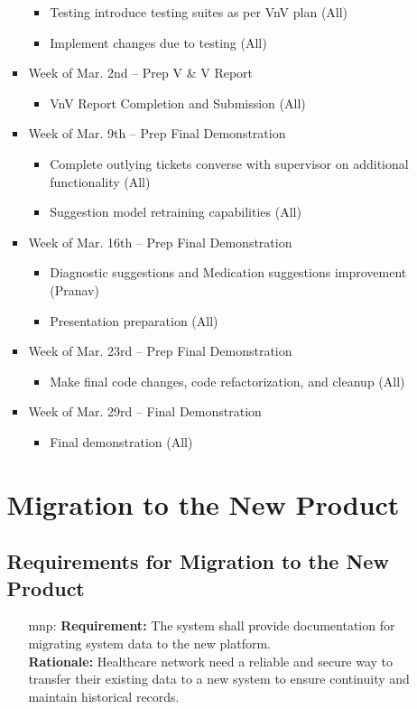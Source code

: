 \documentclass[12pt]{article}
\newcounter{mnpnum} %
\begin{document}
\begin{itemize}
\begin{itemize}
\begin{itemize}
\begin{itemize}
      \item Testing introduce testing suites as per VnV plan (All)
      \item Implement changes due to testing (All)
    \end{itemize}
  \item Week of Mar. 2nd -- Prep V & V Report
    \begin{itemize}
      \item VnV Report Completion and Submission (All)
    \end{itemize}
  \item Week of Mar. 9th -- Prep Final Demonstration
    \begin{itemize}
      \item Complete outlying tickets converse with supervisor on additional functionality (All)
      \item Suggestion model retraining capabilities (All)
    \end{itemize}
  \item Week of Mar. 16th -- Prep Final Demonstration
    \begin{itemize}
      \item Diagnostic suggestions and Medication suggestions improvement (Pranav)
      \item Presentation preparation (All)
    \end{itemize}
  \item Week of Mar. 23rd -- Prep Final Demonstration
    \begin{itemize}
      \item Make final code changes, code refactorization, and cleanup (All)
    \end{itemize}
  \item Week of Mar. 29rd -- Final Demonstration
    \begin{itemize}
      \item Final demonstration (All)
    \end{itemize}

\end{itemize}

\section{Migration to the New Product}
\subsection{Requirements for Migration to the New Product}
\begin{itemize}
  \item [mnp\refstepcounter{mnpnum}\themnpnum \label{MNP_tools}:] 
  \textbf{Requirement:} The system shall provide documentation for migrating system data to the new platform.\\
  \textbf{Rationale:} Healthcare network need a reliable and secure way to transfer their existing data to a new system to ensure continuity and maintain historical records.\\


\end{itemize}
\end{itemize}
\end{itemize}
\end{document}
